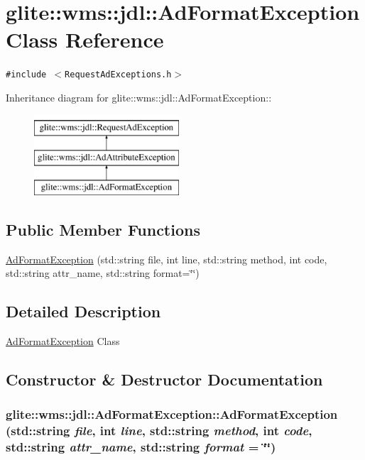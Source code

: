 \hypertarget{classglite_1_1wms_1_1jdl_1_1AdFormatException}{
\section{glite::wms::jdl::Ad\-Format\-Exception Class Reference}
\label{classglite_1_1wms_1_1jdl_1_1AdFormatException}
}
{\tt \#include $<$Request\-Ad\-Exceptions.h$>$}

Inheritance diagram for glite::wms::jdl::Ad\-Format\-Exception::\begin{figure}[H]
\begin{center}
\leavevmode
\includegraphics[height=3cm]{classglite_1_1wms_1_1jdl_1_1AdFormatException}
\end{center}
\end{figure}
\subsection*{Public Member Functions}
\begin{CompactItemize}
\item 
\hyperlink{classglite_1_1wms_1_1jdl_1_1AdFormatException_a0}{Ad\-Format\-Exception} (std::string file, int line, std::string method, int code, std::string attr\_\-name, std::string format=\char`\"{}\char`\"{})
\end{CompactItemize}


\subsection{Detailed Description}
\hyperlink{classglite_1_1wms_1_1jdl_1_1AdFormatException}{Ad\-Format\-Exception} Class 



\subsection{Constructor \& Destructor Documentation}
\hypertarget{classglite_1_1wms_1_1jdl_1_1AdFormatException_a0}{
\subsubsection[AdFormatException]{\setlength{\rightskip}{0pt plus 5cm}glite::wms::jdl::Ad\-Format\-Exception::Ad\-Format\-Exception (std::string {\em file}, int {\em line}, std::string {\em method}, int {\em code}, std::string {\em attr\_\-name}, std::string {\em format} = \char`\"{}\char`\"{})}}
\label{classglite_1_1wms_1_1jdl_1_1AdFormatException_a0}


